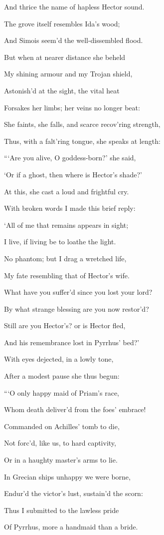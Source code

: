 And thrice the name of hapless Hector sound.

The grove itself resembles Ida’s wood;

And Simois seem’d the well-dissembled flood.

But when at nearer distance she beheld

My shining armour and my Trojan shield,

Astonish’d at the sight, the vital heat

Forsakes her limbs; her veins no longer beat:

She faints, she falls, and scarce recov’ring strength,

Thus, with a falt’ring tongue, she speaks at length:

“‘Are you alive, O goddess-born?’ she said,

‘Or if a ghost, then where is Hector’s shade?’

At this, she cast a loud and frightful cry.

With broken words I made this brief reply:

‘All of me that remains appears in sight;

I live, if living be to loathe the light.

No phantom; but I drag a wretched life,

My fate resembling that of Hector’s wife.

What have you suffer’d since you lost your lord?

By what strange blessing are you now restor’d?

Still are you Hector’s? or is Hector fled,

And his remembrance lost in Pyrrhus’ bed?’

With eyes dejected, in a lowly tone,

After a modest pause she thus begun:

“‘O only happy maid of Priam’s race,

Whom death deliver’d from the foes’ embrace!

Commanded on Achilles’ tomb to die,

Not forc’d, like us, to hard captivity,

Or in a haughty master’s arms to lie.

In Grecian ships unhappy we were borne,

Endur’d the victor’s lust, sustain’d the scorn:

Thus I submitted to the lawless pride

Of Pyrrhus, more a handmaid than a bride.

